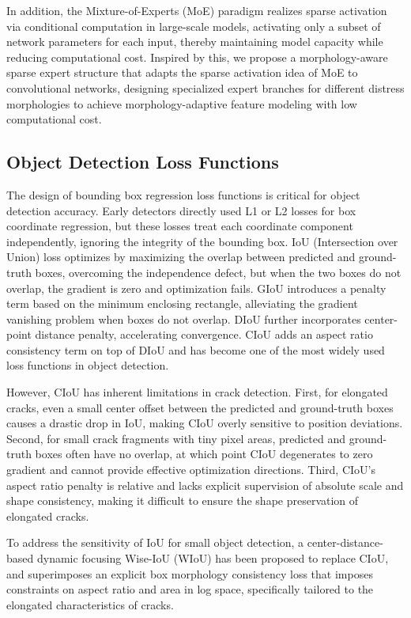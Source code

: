 \documentclass[twocolumn]{sn-jnl}
\begin{document}
	In addition, the Mixture-of-Experts (MoE) paradigm realizes sparse activation via conditional computation in large-scale models, activating only a subset of network parameters for each input, thereby maintaining model capacity while reducing computational cost. Inspired by this, we propose a morphology-aware sparse expert structure that adapts the sparse activation idea of MoE to convolutional networks, designing specialized expert branches for different distress morphologies to achieve morphology-adaptive feature modeling with low computational cost.
	
	\subsection{Object Detection Loss Functions}
	The design of bounding box regression loss functions is critical for object detection accuracy. Early detectors directly used L1 or L2 losses for box coordinate regression, but these losses treat each coordinate component independently, ignoring the integrity of the bounding box. IoU (Intersection over Union) loss optimizes by maximizing the overlap between predicted and ground-truth boxes, overcoming the independence defect, but when the two boxes do not overlap, the gradient is zero and optimization fails. GIoU introduces a penalty term based on the minimum enclosing rectangle, alleviating the gradient vanishing problem when boxes do not overlap. DIoU further incorporates center-point distance penalty, accelerating convergence. CIoU adds an aspect ratio consistency term on top of DIoU and has become one of the most widely used loss functions in object detection.
	
	However, CIoU has inherent limitations in crack detection. First, for elongated cracks, even a small center offset between the predicted and ground-truth boxes causes a drastic drop in IoU, making CIoU overly sensitive to position deviations. Second, for small crack fragments with tiny pixel areas, predicted and ground-truth boxes often have no overlap, at which point CIoU degenerates to zero gradient and cannot provide effective optimization directions. Third, CIoU's aspect ratio penalty is relative and lacks explicit supervision of absolute scale and shape consistency, making it difficult to ensure the shape preservation of elongated cracks.
	
	To address the sensitivity of IoU for small object detection, a center-distance-based dynamic focusing Wise-IoU (WIoU) \cite{Sui2022} has been proposed to replace CIoU, and superimposes an explicit box morphology consistency loss that imposes constraints on aspect ratio and area in log space, specifically tailored to the elongated characteristics of cracks.
	
\end{document}
